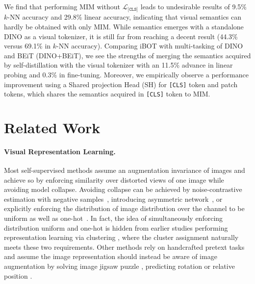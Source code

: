 \documentclass{article} %
\def\ourmethod{{iBOT}\xspace}
\begin{document}
We find that performing MIM without $\mathcal{L}_{\texttt{[CLS]}}$ leads to undesirable results of 9.5\% $k$-NN accuracy and 29.8\% linear accuracy, indicating that visual semantics can hardly be obtained with only MIM.
While semantics emerges with a standalone DINO as a visual tokenizer, it is still far from reaching a decent result (44.3\% versus 69.1\% in $k$-NN accuracy).
Comparing \ourmethod with multi-tasking of DINO and BEiT (DINO+BEiT), we see the strengths of merging the semantics acquired by self-distillation with the visual tokenizer with an 11.5\% advance in linear probing and 0.3\% in fine-tuning.
Moreover, we empirically observe a performance improvement using a Shared projection Head (SH) for \texttt{[CLS]} token and patch tokens, which shares the semantics acquired in \texttt{[CLS]} token to MIM.


\section{Related Work}

\paragraph{Visual Representation Learning.} 
Most self-supervised methods assume an augmentation invariance of images and achieve so by enforcing similarity over distorted views of one image while avoiding model collapse.
Avoiding collapse can be achieved by noise-contrastive estimation with negative samples~\citep{instdist,moco,simclr}, introducing asymmetric network~\citep{byol,simsiam}, or explicitly enforcing the distribution of image distribution over the channel to be uniform as well as one-hot~\citep{swav,self-classifier,dino}. 
In fact, the idea of simultaneously enforcing distribution uniform and one-hot is hidden from earlier studies performing representation learning via clustering \citep{deepcluster,swav,self-labelling}, where the cluster assignment naturally meets these two requirements.
Other methods rely on handcrafted pretext tasks and assume the image representation should instead be aware of image augmentation by solving image jigsaw puzzle \citep{jigsaw,iterjigsaw}, predicting rotation \citep{rotnet} or relative position \citep{pos}. 
\end{document}
